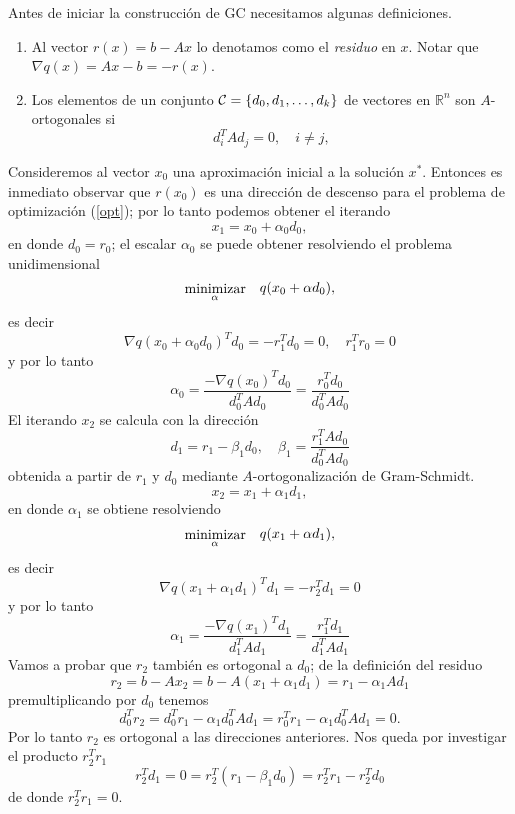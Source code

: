 \documentclass[12pt]{article}
\newcommand{\real}{\mathbb{R}}
\newcommand{\beas}{\begin{eqnarray*}}
\newcommand{\eeas}{\end{eqnarray*}}
\begin{document}
Antes de iniciar la construcci\'on de GC necesitamos algunas definiciones.
\begin{enumerate}
 \item Al vector  $r(x) = b - Ax$ lo denotamos como el {\em residuo} en $x$. Notar que $\nabla q(x) = Ax -b= -r(x)$.
 \item Los elementos de un conjunto ${\cal C} = \{d_0, d_1, \ldots, d_k \}$ de vectores en $\real^n$ son $A$-ortogonales si 
       \[
           d_i^TAd_j = 0, \quad i\ne j,
       \]
 \end{enumerate}
Consideremos al vector $x_0$ una aproximaci\'on inicial a la soluci\'on $x^*$. Entonces es inmediato observar que  $r(x_0)$ es  una direcci\'on de descenso para el problema de optimizaci\'on (\ref{opt}); por lo tanto podemos obtener el iterando
\[
   x_1 = x_0 + \alpha_0 d_0,
\]
en donde $d_0 = r_0$; el escalar $\alpha_0$ se puede obtener resolviendo el problema unidimensional
\beas
  \stackrel{ \mbox{minimizar}} { {}_\alpha  } & & \raisebox{1.0ex}{$q(x_0 + \alpha d_0),$}
\eeas
es decir
\[
    \nabla q(x_0 + \alpha_0 d_0)^Td_0 =  - r_1^T d_0  = 0, \quad  r_1^Tr_0 = 0
\]
y por lo tanto
\[
   \alpha_0 =  \frac{ -\nabla q(x_0)^T d_0 }{d_0^T A d_0} = \frac{r_0^Td_0}{d_0^TAd_0}
\]
El iterando $x_2$ se calcula con la direcci\'on 
\[
  d_1 = r_1 - \beta_1 d_0,  \quad  \beta_1 =  \frac{r_1^TAd_0}{d_0^TAd_0}
\]
obtenida a partir de $r_1$ y $d_0$ mediante $A$-ortogonalizaci\'on de Gram-Schmidt. %
\[
   x_2 = x_1 + \alpha_1 d_1, 
\]
en donde $\alpha_1$ se obtiene resolviendo 
\beas
  \stackrel{ \mbox{minimizar}} { {}_\alpha  } & & \raisebox{1.0ex}{$q(x_1 + \alpha d_1),$}
\eeas
es decir
\[
   \nabla q(x_1 + \alpha_1 d_1)^Td_1 =  -r_2^Td_1 = 0
\]
y por lo tanto
\[
  \alpha_1 = \frac{ -\nabla q(x_1)^T d_1 }{d_1^T A d_1} = \frac{r_1^Td_1}{d_1^TAd_1}
\]
Vamos a probar que $r_2$ tambi\'en es ortogonal a $d_0$; de la definici\'on del residuo
\[
    r_2 = b - Ax_2 = b - A(x_1 + \alpha_1d_1) = r_1 - \alpha_1 Ad_1
\]
premultiplicando por $d_0$ tenemos
\[
   d_0^Tr_2 = d_0^Tr_1 - \alpha_1 d_0^T Ad_1 = r_0^Tr_1 - \alpha_1 d_0^T Ad_1 = 0.
\]
Por lo tanto $r_2$ es ortogonal a las direcciones anteriores.  Nos queda por investigar el producto $r_2^Tr_1$ 
\[
   r_2^Td_1 = 0 = r_2^T(r_1 - \beta_1d_0) =  r_2^Tr_1 - r_2^Td_0 
\]
de donde $r_2^Tr_1 = 0$.
\end{document}
